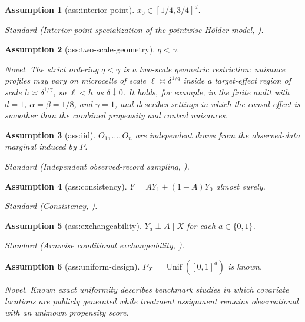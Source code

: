\documentclass{article}
\newtheorem{assumption}{Assumption}
\begin{document}
\begin{assumption}[ass:interior-point]\label{ass:interior-point}
\(x_0\in[1/4,3/4]^d\).
\par\smallskip\noindent\emph{Standard} (Interior-point specialization of the pointwise Hölder model, \cite{kennedy2024minimax}).
\end{assumption}

\begin{assumption}[ass:two-scale-geometry]\label{ass:two-scale-geometry}
\(q<\gamma\).
\par\smallskip\noindent\emph{Novel.} The strict ordering \(q<\gamma\) is a two-scale geometric restriction: nuisance profiles may vary on microcells of scale \(\ell\asymp\delta^{1/q}\) inside a target-effect region of scale \(h\asymp\delta^{1/\gamma}\), so \(\ell<h\) as \(\delta\downarrow0\). It holds, for example, in the finite audit with \(d=1\), \(\alpha=\beta=1/8\), and \(\gamma=1\), and describes settings in which the causal effect is smoother than the combined propensity and control nuisances.
\end{assumption}

\begin{assumption}[ass:iid]\label{ass:iid}
\(O_1,\ldots,O_n\) are independent draws from the observed-data marginal induced by \(P\).
\par\smallskip\noindent\emph{Standard} (Independent observed-record sampling, \cite{kennedy2024minimax}).
\end{assumption}

\begin{assumption}[ass:consistency]\label{ass:consistency}
\(Y=AY_1+(1-A)Y_0\) almost surely.
\par\smallskip\noindent\emph{Standard} (Consistency, \cite{kennedy2024minimax}).
\end{assumption}

\begin{assumption}[ass:exchangeability]\label{ass:exchangeability}
\(Y_a\perp A\mid X\) for each \(a\in\{0,1\}\).
\par\smallskip\noindent\emph{Standard} (Armwise conditional exchangeability, \cite{kennedy2024minimax}).
\end{assumption}

\begin{assumption}[ass:uniform-design]\label{ass:uniform-design}
\(P_X=\operatorname{Unif}([0,1]^d)\) is known.
\par\smallskip\noindent\emph{Novel.} Known exact uniformity describes benchmark studies in which covariate locations are publicly generated while treatment assignment remains observational with an unknown propensity score.
\end{assumption}
\end{document}
